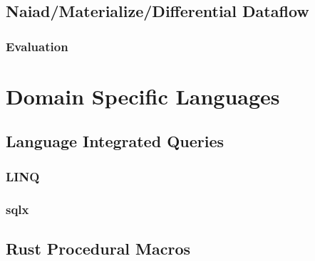 \subsection{Naiad/Materialize/Differential Dataflow}
\subsubsection{Evaluation}
\section{Domain Specific Languages}
\subsection{Language Integrated Queries}
\subsubsection{LINQ}

\subsubsection{sqlx}

\subsection{Rust Procedural Macros}

